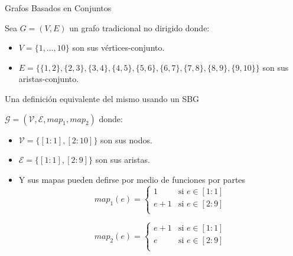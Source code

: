 \begin{frame}{Grafos Basados en Conjuntos}

Sea $G = (V,E)$ un grafo tradicional no dirigido donde:

\scriptsize
\begin{itemize}
    \item \scriptsize $V = \{1, \ldots, 10\}$ \small son sus vértices-conjunto.
    \item \scriptsize $E = \{ \{1,2\}, \{2,3\}, \{3,4\}, \{4,5\}, \{5,6\}, 
    \{6,7\}, \{7,8\}, \{8,9\},\{9,10\} \}$ \small son sus aristas-conjunto.
\end{itemize}


\small
Una definición equivalente del mismo usando un SBG

$\mathcal{G} = (\mathcal{V}, \mathcal{E}, map_1, map_2)$ donde:

\begin{itemize}
    \item \scriptsize $\mathcal{V} = \{[1:1], [2:10]\}$ \small son sus nodos.
    \item \scriptsize $\mathcal{E} = \{ [1:1], [2:9] \}$ \small son sus aristas.
    \item Y sus mapas pueden defirse por medio de funciones por partes \scriptsize
    \[
        map_1(e)= \left \{ \begin {array} {ll}
                           1 & \text{si } e \in [1:1] \\
                           e + 1 & \text{si } e \in [2:9] \\
                         \end {array} \right.
    \]

    \[
        map_2(e)= \left \{ \begin {array} {ll}
                           e + 1 & \text{si } e \in [1:1] \\
                           e & \text{si } e \in [2:9] \\
                         \end {array} \right.
    \]

\end{itemize}

\end{frame}


